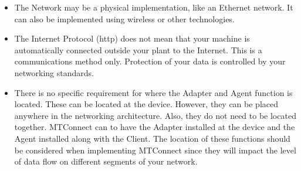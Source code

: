 \begin{itemize}
\item The Network may be a physical implementation, like an Ethernet network. It can also be implemented using wireless or other technologies.
\item The Internet Protocol (http) does not mean that your machine is automatically connected outside your plant to the Internet. This is a communications method only. Protection of your data is controlled by your networking standards. 
\item There is no specific requirement for where the Adapter and Agent function is located. These can be located at the device. However, they can be placed anywhere in the networking architecture. Also, they do not need to be located together. MTConnect can to have the Adapter installed at the device and the Agent installed along with the Client. The location of these functions should be considered when implementing MTConnect since they will impact the level of data flow on different segments of your network.
\end{itemize}
